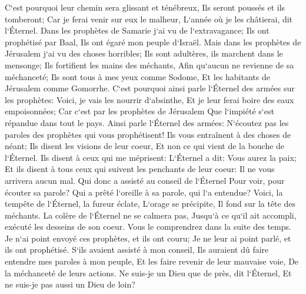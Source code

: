 \verse C`est pourquoi leur chemin sera glissant et ténébreux, Ils seront poussés et ils tomberont; Car je ferai venir sur eux le malheur, L`année où je les châtierai, dit l`Éternel. 
\verse Dans les prophètes de Samarie j`ai vu de l`extravagance; Ils ont prophétisé par Baal, Ils ont égaré mon peuple d`Israël. 
\verse Mais dans les prophètes de Jérusalem j`ai vu des choses horribles; Ils sont adultères, ils marchent dans le mensonge; Ils fortifient les mains des méchants, Afin qu`aucun ne revienne de sa méchanceté; Ils sont tous à mes yeux comme Sodome, Et les habitants de Jérusalem comme Gomorrhe. 
\verse C`est pourquoi ainsi parle l`Éternel des armées sur les prophètes: Voici, je vais les nourrir d`absinthe, Et je leur ferai boire des eaux empoisonnées; Car c`est par les prophètes de Jérusalem Que l`impiété s`est répandue dans tout le pays. 
\verse Ainsi parle l`Éternel des armées: N`écoutez pas les paroles des prophètes qui vous prophétisent! Ils vous entraînent à des choses de néant; Ils disent les visions de leur coeur, Et non ce qui vient de la bouche de l`Éternel. 
\verse Ils disent à ceux qui me méprisent: L`Éternel a dit: Vous aurez la paix; Et ils disent à tous ceux qui suivent les penchants de leur coeur: Il ne vous arrivera aucun mal. 
\verse Qui donc a assisté au conseil de l`Éternel Pour voir, pour écouter sa parole? Qui a prêté l`oreille à sa parole, qui l`a entendue? 
\verse Voici, la tempête de l`Éternel, la fureur éclate, L`orage se précipite, Il fond sur la tête des méchants. 
\verse La colère de l`Éternel ne se calmera pas, Jusqu`à ce qu`il ait accompli, exécuté les desseins de son coeur. Vous le comprendrez dans la suite des temps. 
\verse Je n`ai point envoyé ces prophètes, et ils ont couru; Je ne leur ai point parlé, et ils ont prophétisé. 
\verse S`ils avaient assisté à mon conseil, Ils auraient dû faire entendre mes paroles à mon peuple, Et les faire revenir de leur mauvaise voie, De la méchanceté de leurs actions. 
\verse Ne suis-je un Dieu que de près, dit l`Éternel, Et ne suis-je pas aussi un Dieu de loin? 
